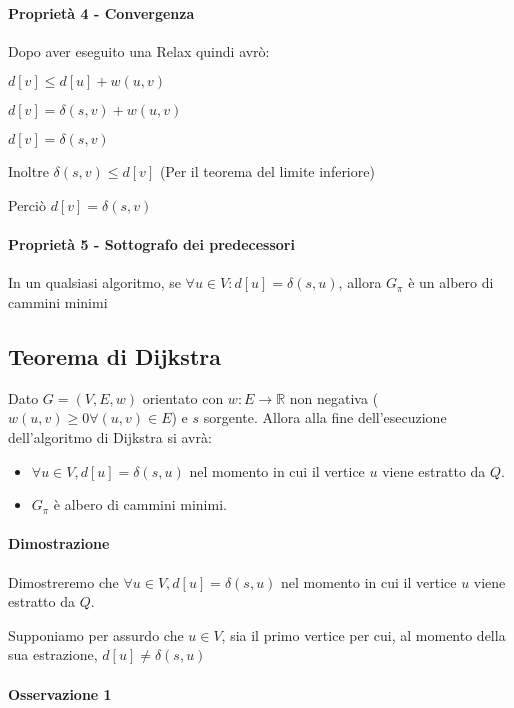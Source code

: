 \paragraph{Proprietà 4 - Convergenza}

{Dopo aver eseguito una Relax quindi avrò:}

$d[v] \leq d[u] + w(u,v)$

$d[v] = \delta(s,v) + w(u,v)$

$d[v] = \delta(s,v)$

Inoltre $\delta(s,v) \leq d[v]$ (Per il teorema del limite inferiore)

Perciò $d[v]=\delta(s,v)$

\paragraph{Proprietà 5 - Sottografo dei predecessori}

{In un qualsiasi algoritmo, se $\forall u \in V: d[u] = \delta(s,u)$, allora $G_\pi$ è un albero di cammini minimi}

\subsection{Teorema di Dijkstra}

{Dato $G=(V,E,w)$ orientato con $w:E\rightarrow \mathbb{R}$ non negativa ($w(u,v) \geq 0 \forall (u,v) \in E$) e $s$ sorgente. Allora alla fine dell'esecuzione dell'algoritmo di Dijkstra si avrà:}

\begin{itemize}
\tightlist
\item
{$\forall u \in V, d[u]=\delta(s,u)$ nel momento in cui il vertice $u$ viene estratto da $Q$.}
\item
{$G_\pi$ è albero di cammini minimi.}
\end{itemize}

\paragraph{Dimostrazione}

{Dimostreremo che $\forall u \in V, d[u]=\delta(s,u)$ nel momento in cui il vertice $u$ viene estratto da $Q$.}

{Supponiamo per assurdo che $u\in V$, sia il primo vertice per cui, al momento della sua estrazione, $d[u] \neq \delta(s,u)$}

\paragraph{Osservazione 1}

